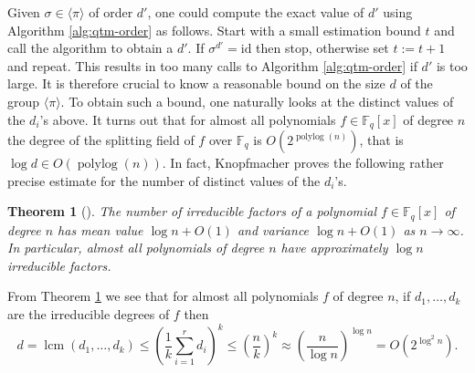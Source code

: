 \documentclass[12pt]{article}
\theoremstyle{plain}
\newtheorem{theorem}{Theorem}
\theoremstyle{definition}
\newcommand{\lrang}[1]{\langle#1\rangle}
\DeclareMathOperator{\lcm}{lcm} %
\DeclareMathOperator{\polylog}{polylog}
\def\F{\ensuremath{\mathbb{F}}}
\begin{document}
Given $\sigma \in \lrang{\pi}$ of order $d'$, one could compute the exact value of $d'$ using 
Algorithm \ref{alg:qtm-order} as follows. Start with a small estimation bound $t$ and call the 
algorithm to obtain a $d'$. If $\sigma^{d'} = \text{id}$ then stop, otherwise set $t := t + 1$ and 
repeat. This results in too many calls to Algorithm \ref{alg:qtm-order} if $d'$ is too large. It is 
therefore crucial to know a reasonable bound on the size $d$ of the group $\lrang{\pi}$. To obtain 
such a bound, one naturally looks at the distinct values of the $d_i$'s above. It turns out that 
for almost all polynomials $f \in \F_q[x]$ of degree $n$ the degree of the splitting field of $f$ 
over $\F_q$ is $O(2^{\polylog(n)})$, that is $\log d \in O(\polylog(n))$. In fact, Knopfmacher 
proves the following rather precise estimate for the number of distinct values of the $d_i$'s.
\begin{theorem}[\cite{knopfmacher1999degrees}]
	\label{thm:d-mean}
	The number of irreducible factors of a polynomial $f \in \F_q[x]$ of degree $n$ has mean value 
	$\log n + O(1)$ and variance $\log n + O(1)$ as $n \rightarrow \infty$. In particular, almost 
	all polynomials of degree $n$ have approximately $\log n$ irreducible factors.
\end{theorem}
From Theorem \ref{thm:d-mean} we see that for almost all polynomials $f$ of degree $n$, if $d_1, 
\dots, d_k$ are the irreducible degrees of $f$ then 
\begin{equation}
	\label{equ:ag-mean}
	d = \lcm(d_1, \dots, d_k) \le \left( \frac{1}{k} \sum_{i = 1}^rd_i \right)^k \le \left( 
	\frac{n}{k} \right)^k \approx \left( \frac{n}{\log n} \right)^{\log n} = O(2^{\log^2n}).
\end{equation}
\end{document}
